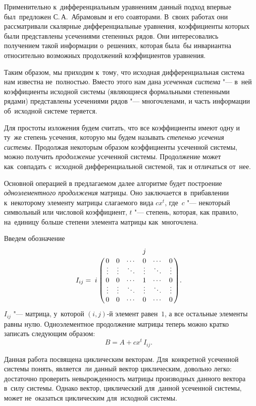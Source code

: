 Применительно к~дифференциальным уравнениям данный подход впервые был~предложен С.\,А.~Абрамовым и его соавторами.
В~своих работах \cite{litAbramovTruncatedSeries, litAbramovScalarEquations}
они рассматривали скалярные дифференциальные уравнения,
коэффициенты которых были представлены усечениями степенных рядов.
Они интересовались получением такой информации о~решениях,
которая была~бы инвариантна относительно возможных продолжений коэффициентов уравнения.

Таким образом, мы приходим к~тому, что исходная дифференциальная система нам известна не~полностью.
Вместо этого нам дана \emph{усеченная система} "--- в~ней коэффициенты исходной системы (являющиеся формальными степенными рядами) представлены
усечениями рядов "--- многочленами, и часть информации об~исходной системе теряется.

Для простоты изложения будем считать, что все коэффициенты имеют одну и ту~же степень усечения,
которую мы будем называть \emph{степенью усечения системы}.
Продолжая некоторым образом коэффициенты усеченной системы, можно получить \emph{продолжение} усеченной системы.
Продолжение может как~совпадать с~исходной дифференциальной системой, так и отличаться от~нее.

Основной операцией в предлагаемом далее алгоритме будет построение \emph{одноэлементного продолжения} матрицы.
Оно заключается в~прибавлении к~некоторому элементу матрицы слагаемого вида $cx^t$,
где~$c$ "--- некоторый символьный или числовой коэффициент,
$t$ "--- степень, которая, как правило, на~единицу больше степени элемента матрицы как~многочлена.

Введем обозначение
\begin{equation*}
	I_{ij} = 
	\bordermatrix{
		&           &         &        & j      &        &        \cr
		&   0       & 0       & \cdots & 0      & \cdots & 0      \cr
		&   \vdots  & \vdots  & \ddots & \vdots & \ddots & \vdots \cr
		i & 0       & 0       & \cdots & 1      & \cdots & 0      \cr
		&   \vdots  & \vdots  & \ddots & \vdots & \ddots & \vdots \cr
		&   0       & 0       & \cdots & 0      & \cdots & 0      \cr
	}.
\end{equation*}
$I_{ij}$ "--- матрица, у~которой $(i, j)$-й элемент равен~$1$, а все остальные элементы равны нулю.
Одноэлементное продолжение матрицы теперь можно кратко записать следующим образом:
\begin{equation*}
	B = A + cx^t \, I_{ij}.
\end{equation*}

Данная работа посвящена циклическим векторам.
Для~конкретной усеченной системы понять, является~ли данный вектор циклическим, довольно легко:
достаточно проверить невырожденность матрицы производных данного вектора в~силу системы.
Однако вектор, циклический для~данной усеченной системы, может не~оказаться циклическим для~исходной системы.

